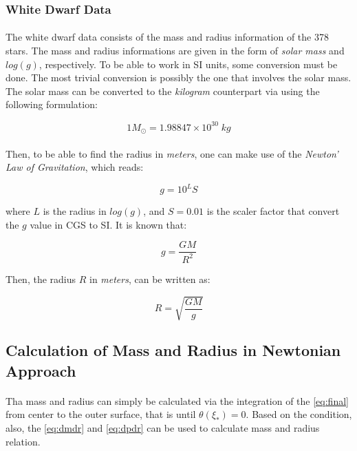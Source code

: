 \documentclass[letterpaper,12pt]{article}
\begin{document}
\subsubsection{White Dwarf Data}

\paragraph{} The white dwarf data consists of the mass and radius information of the 378 stars. The mass and radius informations are given in the form of \textit{solar mass} and $\mathit{log(g)}$, respectively. To be able to work in SI units, some conversion must be done. The most trivial conversion is possibly the one that involves the solar mass. The solar mass can be converted to the \textit{kilogram} counterpart via using the following formulation:

\begin{equation*}
    1 M_\odot = 1.98847 \times 10^{30} \; kg
\end{equation*}

\paragraph{} Then, to be able to find the radius in \textit{meters}, one can make use of the \textit{Newton' Law of Gravitation}, which reads:

\begin{equation*}
    g = 10 ^ {L} S
\end{equation*}

where $L$ is the radius in $\mathit{log(g)}$, and $S = 0.01$ is the scaler factor that convert the $g$ value in CGS to SI. It is known that:

\begin{equation*}
    g = \frac{GM}{R^2}
\end{equation*}

Then, the radius $R$ in \textit{meters}, can be written as:

\begin{equation*}
    R = \sqrt{\frac{GM}{g}}
\end{equation*}

\subsection{Calculation of Mass and Radius in Newtonian Approach}
\paragraph{} Tha mass and radius can simply be calculated via the integration of the \eqref{eq:final}  from center to the outer surface, that is until $\theta(\xi_*) = 0$. Based on the condition, also, the \eqref{eq:dmdr} and \eqref{eq:dpdr} can be used to calculate mass and radius relation.
\end{document}
